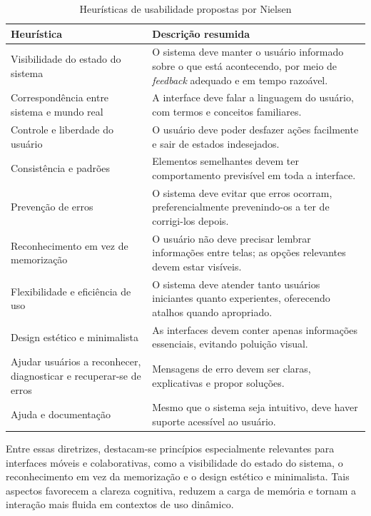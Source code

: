         \begin{table}[h]
        \centering
        \caption{Heurísticas de usabilidade propostas por Nielsen}
        \label{tab:heuristicas_nielsen}
        \begin{tabular}{p{4cm}p{10cm}}
        \toprule
        \textbf{Heurística} & \textbf{Descrição resumida} \\
        \midrule
        Visibilidade do estado do sistema & O sistema deve manter o usuário informado sobre o que está acontecendo, por meio de \textit{feedback} adequado e em tempo razoável. \\
        Correspondência entre sistema e mundo real & A interface deve falar a linguagem do usuário, com termos e conceitos familiares. \\
        Controle e liberdade do usuário & O usuário deve poder desfazer ações facilmente e sair de estados indesejados. \\
        Consistência e padrões & Elementos semelhantes devem ter comportamento previsível em toda a interface. \\
        Prevenção de erros & O sistema deve evitar que erros ocorram, preferencialmente prevenindo-os a ter de corrigi-los depois. \\
        Reconhecimento em vez de memorização & O usuário não deve precisar lembrar informações entre telas; as opções relevantes devem estar visíveis. \\
        Flexibilidade e eficiência de uso & O sistema deve atender tanto usuários iniciantes quanto experientes, oferecendo atalhos quando apropriado. \\
        Design estético e minimalista & As interfaces devem conter apenas informações essenciais, evitando poluição visual. \\
        Ajudar usuários a reconhecer, diagnosticar e recuperar-se de erros & Mensagens de erro devem ser claras, explicativas e propor soluções. \\
        Ajuda e documentação & Mesmo que o sistema seja intuitivo, deve haver suporte acessível ao usuário. \\
        \bottomrule
        \end{tabular}
        \end{table}

        Entre essas diretrizes, destacam-se princípios especialmente relevantes para interfaces móveis e colaborativas, como a visibilidade do estado do sistema, o reconhecimento em vez da memorização e o design estético e minimalista. Tais aspectos favorecem a clareza cognitiva, reduzem a carga de memória e tornam a interação mais fluida em contextos de uso dinâmico.

